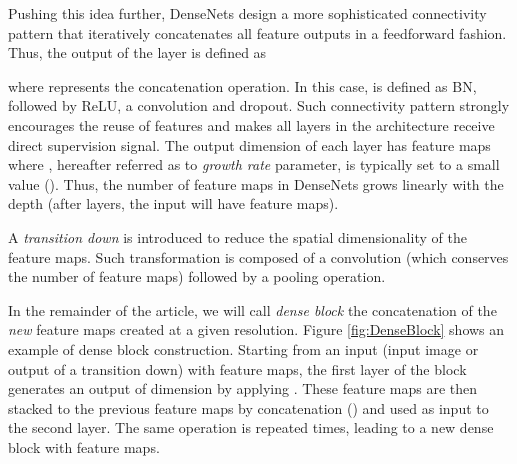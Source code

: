 \documentclass[10pt,twocolumn,letterpaper]{article}
\begin{document}
Pushing this idea further, DenseNets \cite{DenseNet2016} design a more sophisticated connectivity pattern that iteratively concatenates all feature outputs in a feedforward fashion. Thus, the output of the  layer is defined as

where  represents the concatenation operation. In this case,  is defined as BN, followed by ReLU, a convolution and dropout. Such connectivity pattern strongly encourages the reuse of features and makes all layers in the architecture receive direct supervision signal. The output dimension of each layer  has  feature maps where , hereafter referred as to \emph{growth rate} parameter, is typically set to a small value (\eg ). Thus, the number of feature maps in DenseNets grows linearly with the depth (\eg after  layers, the input  will have  feature maps). 

A \emph{transition down} is introduced to reduce the spatial dimensionality of the feature maps. Such transformation is composed of a  convolution (which conserves the number of feature maps) followed by a  pooling operation. 

In the remainder of the article, we will call \emph{dense block} the concatenation of the \emph{new} feature maps created at a given resolution. Figure \ref{fig:DenseBlock} shows an example of dense block construction. Starting from an input  (input image or output of a transition down) with  feature maps, the first layer of the block generates an output  of dimension  by applying . These  feature maps are then stacked to the previous  feature maps by concatenation () and used as input to the second layer. The same operation is repeated  times, leading to a new dense block with  feature maps.
\end{document}
